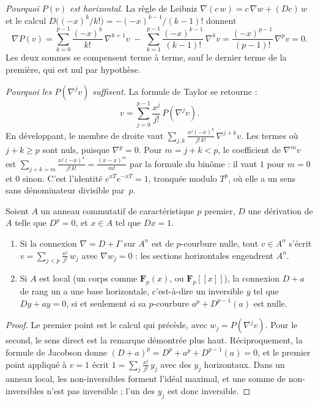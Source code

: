 \noindent\emph{Pourquoi $P(v)$ est horizontal.} La règle de Leibniz $\nabla(c\,w) = c\,\nabla w + (Dc)\,w$ et le calcul $D\bigl((-x)^k/k!\bigr) = -(-x)^{k-1}/(k-1)!$ donnent
\[
\nabla P(v) = \sum_{k=0}^{p-1} \frac{(-x)^k}{k!}\, \nabla^{k+1} v \;-\; \sum_{k=1}^{p-1} \frac{(-x)^{k-1}}{(k-1)!}\, \nabla^{k} v = \frac{(-x)^{p-1}}{(p-1)!}\, \nabla^p v = 0 .
\]
Les deux sommes se compensent terme à terme, sauf le dernier terme de la première, qui est nul par hypothèse.

\noindent\emph{Pourquoi les $P(\nabla^j v)$ suffisent.} La formule de Taylor se retourne :
\[
v = \sum_{j=0}^{p-1} \frac{x^j}{j!}\, P(\nabla^j v) .
\]
En développant, le membre de droite vaut $\sum_{j,k} \frac{x^j (-x)^k}{j!\,k!}\, \nabla^{j+k} v$. Les termes où $j + k \geq p$ sont nuls, puisque $\nabla^p = 0$. Pour $m = j + k < p$, le coefficient de $\nabla^m v$ est $\sum_{j+k=m} \frac{x^j(-x)^k}{j!\,k!} = \frac{(x - x)^m}{m!}$ par la formule du binôme : il vaut $1$ pour $m = 0$ et $0$ sinon. C'est l'identité $e^{xT} e^{-xT} = 1$, tronquée modulo $T^p$, où elle a un sens sans dénominateur divisible par~$p$.

\begin{encadre}
\begin{enonce}
Soient $A$ un anneau commutatif de caractéristique $p$ premier, $D$ une dérivation de $A$ telle que $D^p = 0$, et $x \in A$ tel que $Dx = 1$.
\begin{enumerate}
\item Si la connexion $\nabla = D + \Gamma$ sur $A^n$ est de $p$-courbure nulle, tout $v \in A^n$ s'écrit $v = \sum_{j<p} \frac{x^j}{j!}\, w_j$ avec $\nabla w_j = 0$ : les sections horizontales engendrent $A^n$.
\item Si $A$ est local (un corps comme $\mathbf F_p(x)$, ou $\mathbf F_p[[x]]$), la connexion $D + a$ de rang un a une base horizontale, c'est-à-dire un inversible $y$ tel que $Dy + ay = 0$, si et seulement si sa $p$-courbure $a^p + D^{p-1}(a)$ est nulle.
\end{enumerate}
\end{enonce}
\end{encadre}

\begin{proof}
Le premier point est le calcul qui précède, avec $w_j = P(\nabla^j v)$. Pour le second, le sens direct est la remarque démontrée plus haut. Réciproquement, la formule de Jacobson donne $(D + a)^p = D^p + a^p + D^{p-1}(a) = 0$, et le premier point appliqué à $v = 1$ écrit $1 = \sum_j \frac{x^j}{j!}\, y_j$ avec des $y_j$ horizontaux. Dans un anneau local, les non-inversibles forment l'idéal maximal, et une somme de non-inversibles n'est pas inversible ; l'un des $y_j$ est donc inversible.
\end{proof}

